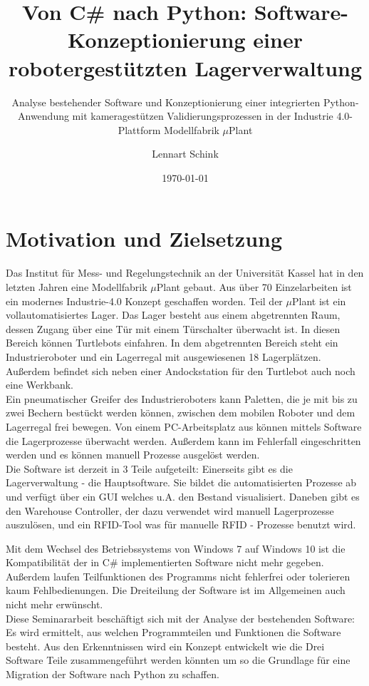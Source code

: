 \documentclass[11pt]{scrartcl}
\title{Von C\# nach Python: Software-Konzeptionierung einer robotergestützten Lagerverwaltung}
\subtitle{Analyse bestehender Software und Konzeptionierung einer integrierten Python-Anwendung mit kameragestützen Validierungsprozessen in der Industrie 4.0-Plattform Modellfabrik $\mu$Plant}
\author{Lennart Schink}
\date{\today}
\begin{document}
    \maketitle
    \tableofcontents
    \newpage

    \section{Motivation und Zielsetzung}
    Das Institut für Mess- und Regelungstechnik an der Universität Kassel hat in den letzten Jahren eine Modellfabrik $\mu$Plant gebaut.
    Aus über 70 Einzelarbeiten ist ein modernes Industrie-4.0 Konzept geschaffen worden. Teil der $\mu$Plant ist ein vollautomatisiertes Lager.
    Das Lager besteht aus einem abgetrennten Raum, dessen Zugang über eine Tür mit einem Türschalter überwacht ist. In diesen Bereich können Turtlebots einfahren.
    In dem abgetrennten Bereich steht ein Industrieroboter und ein Lagerregal mit ausgewiesenen 18 Lagerplätzen. Außerdem befindet sich neben einer Andockstation für den Turtlebot auch noch eine Werkbank. \\

    Ein pneumatischer Greifer des Industrieroboters kann Paletten, die je mit bis zu zwei Bechern bestückt werden können, zwischen dem mobilen Roboter und dem Lagerregal frei bewegen.
    Von einem PC-Arbeitsplatz aus können mittels Software die Lagerprozesse überwacht werden. Außerdem kann im Fehlerfall eingeschritten werden und es können manuell Prozesse ausgelöst werden.\\

    Die Software ist derzeit in 3 Teile aufgeteilt: Einerseits gibt es die Lagerverwaltung - die Hauptsoftware. Sie bildet die automatisierten Prozesse ab und verfügt über ein GUI welches u.A. den Bestand visualisiert.
    Daneben gibt es den Warehouse Controller, der dazu verwendet wird manuell Lagerprozesse auszulösen, und ein RFID-Tool was für manuelle RFID - Prozesse benutzt wird.

    Mit dem Wechsel des Betriebssystems von Windows 7 auf Windows 10 ist die Kompatibilität der in C\# implementierten Software nicht mehr gegeben. Außerdem laufen Teilfunktionen des Programms nicht fehlerfrei oder tolerieren kaum Fehlbedienungen.
    Die Dreiteilung der Software ist im Allgemeinen auch nicht mehr erwünscht. \\

    Diese Seminararbeit beschäftigt sich mit der Analyse der bestehenden Software: Es wird ermittelt, aus welchen Programmteilen und Funktionen die Software besteht.
    Aus den Erkenntnissen wird ein Konzept entwickelt wie die Drei Software Teile zusammengeführt werden könnten um so die Grundlage für eine Migration der Software nach Python zu schaffen.
\end{document}
